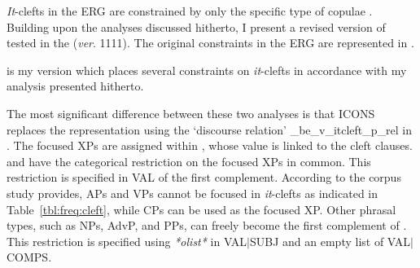 \textit{It}-clefts in the ERG are constrained by only the specific
type of copulae . Building upon the
analyses discussed hitherto, I present a revised version of
 tested in the  (\textit{ver}. 1111).  The
original constraints in the ERG are represented in
.



 is my version which places several constraints on
\textit{it}-clefts in accordance with my analysis presented hitherto.




\noindent The most significant difference between these two analyses
is that ICONS replaces the representation using the `discourse
relation' \_be\_v\_itcleft\_p\_rel in
. The focused XPs are assigned
 within , whose  value is
linked to the cleft clauses.   and
 have the categorical restriction on the focused
XPs in common. This restriction is specified in VAL of the first
complement.  According to the corpus study \citet{kim:07} provides,
APs and VPs cannot be focused in \textit{it}-clefts as indicated in
Table~\ref{tbl:freq:cleft}, while CPs can be used as the focused XP.
Other phrasal types, such as NPs, AdvP, and PPs, can freely become the
first complement of . This restriction is specified
using \textit{*olist*} in \mbox{VAL{$\mid$}SUBJ} and an empty list of
\mbox{VAL{$\mid$}COMPS}.


